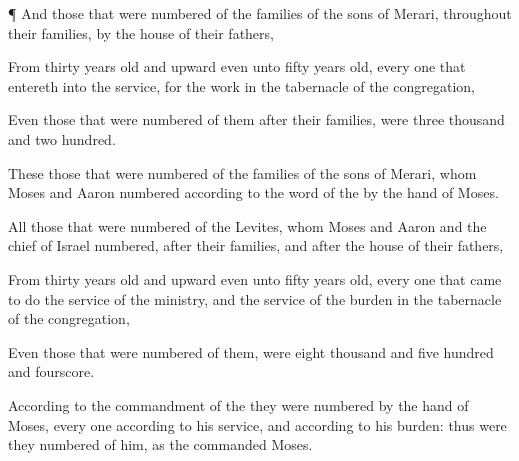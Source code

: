 {\par }{\PP {}¶ And those that were
numbered of the
families of the
sons of
Merari, throughout their
families, by the
house of their
fathers,

From
thirty
years
old and
upward even unto
fifty
years
old, every one that
entereth into the
service, for the
work in the
tabernacle of the
congregation,

Even those that were
numbered of them after their
families, were
three
thousand and two
hundred.

These
{} those that were
numbered of the
families of the
sons of
Merari, whom
Moses and
Aaron
numbered according to the
word of the
{} by the
hand of
Moses.

All those that were
numbered of the
Levites, whom
Moses and
Aaron and the
chief of
Israel
numbered, after their
families, and after the
house of their
fathers,

From
thirty
years
old and
upward even unto
fifty
years
old, every one that
came to
do the service of the
ministry, and the
service of the
burden in the
tabernacle of the
congregation,

Even those that were
numbered of them, were
eight
thousand and
five
hundred and
fourscore.

According to the
commandment of the
{} they were
numbered by the
hand of
Moses,
every
one according to his
service, and according to his
burden: thus were they
numbered of him, as the
{}
commanded
Moses.




\par }

